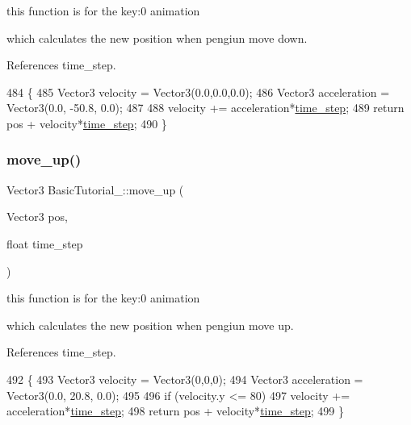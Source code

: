 this function is for the key\+:0 animation 

which calculates the new position when pengiun move down. 

References time\+\_\+step.


\begin{DoxyCode}
484                                                                \{
485     Vector3 velocity = Vector3(0.0,0.0,0.0);
486     Vector3 acceleration = Vector3(0.0, -50.8, 0.0);
487     
488     velocity += acceleration*\hyperlink{_tutorial_application_8cpp_a4feca29d7349adc765dcdf44d396d46a}{time\_step};
489     \textcolor{keywordflow}{return} pos + velocity*\hyperlink{_tutorial_application_8cpp_a4feca29d7349adc765dcdf44d396d46a}{time\_step};
490 \}
\end{DoxyCode}
\mbox{\label{class_basic_tutorial__00_a3bec198c9f41ab006a1193311dfb4e0b}} 
\subsubsection{\texorpdfstring{move\+\_\+up()}{move\_up()}}
{\footnotesize\ttfamily Vector3 Basic\+Tutorial\+\_\+::move\+\_\+up (\begin{DoxyParamCaption}\item[{Vector3}]{pos,  }\item[{float}]{time\+\_\+step }\end{DoxyParamCaption})\hspace{0.3cm}{\ttfamily [virtual]}}



this function is for the key\+:0 animation 

which calculates the new position when pengiun move up. 

References time\+\_\+step.


\begin{DoxyCode}
492                                                              \{
493     Vector3 velocity = Vector3(0,0,0);
494     Vector3 acceleration = Vector3(0.0, 20.8, 0.0);
495     
496     \textcolor{keywordflow}{if} (velocity.y <= 80)
497     velocity += acceleration*\hyperlink{_tutorial_application_8cpp_a4feca29d7349adc765dcdf44d396d46a}{time\_step};
498     \textcolor{keywordflow}{return} pos + velocity*\hyperlink{_tutorial_application_8cpp_a4feca29d7349adc765dcdf44d396d46a}{time\_step};
499 \}
\end{DoxyCode}


